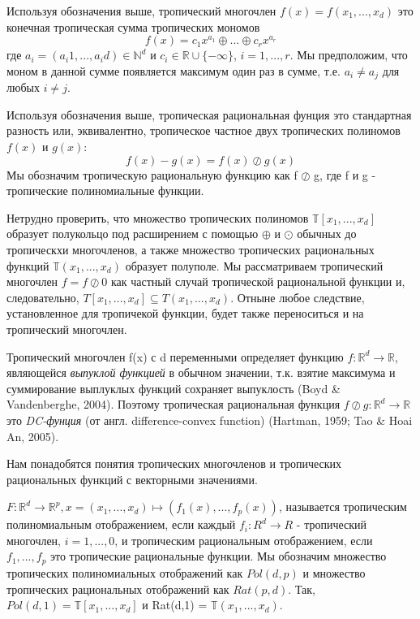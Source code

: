 \documentclass[russian]{lecture-notes}
\begin{document}
	\begin{Definition}
		Используя обозначения выше, тропический многочлен $f(x) = f(x_1,...,x_d)$ это конечная тропическая сумма тропических мономов
		\begin{equation*}
		f(x) = {c_1} x^{a_1} \oplus ... \oplus {c_r}x^{a_r}
		\end{equation*}
		где $a_i = (a_i1,...,a_id) \in \mathbb{N}^d$ и $c_i \in \mathbb{R} \cup \{- \infty\}$, $i=1,...,r$. Мы предположим, что моном в данной сумме появляется максимум один раз в сумме, т.е. $a_i \ne a_j$ для любых $i \ne j$. 
	\end{Definition}
	
	\begin{Definition}
		Используя обозначения выше, тропическая рациональная фунция это стандартная разность или, эквивалентно, тропическое частное двух тропических полиномов $f(x)$ и $g(x)$:
		\begin{equation*}
		f(x) - g(x) = f(x) \oslash g(x)
		\end{equation*}
		Мы обозначим тропическую рациональную функцию как f $\oslash$ g, где f и g - тропические полиномиальные функции.
	\end{Definition}
	
	Нетрудно проверить, что множество тропических полиномов $\mathbb{T}[x_1,...,x_d]$ образует полукольцо под расширением с помощью $\oplus$ и $\odot$ обычных до тропическхи многочленов, а также множество тропических рациональных функций $\mathbb{T}(x_1,...,x_d)$ образует полуполе. Мы рассматриваем тропический многочлен $f = f \oslash 0$ как частный случай тропической рациональной функции и, следовательно, $T[x_1,...,x_d] \subseteq T(x_1,...,x_d)$. Отныне любое следствие, установленное для тропичекой функции, будет также переноситься и на тропический многочлен.
	
	Тропический многочлен f(x) с d переменными определяет функцию $f: \mathbb{R}^d \to \mathbb{R}$, являющейся \textit{выпуклой функцией} в обычном значении, т.к. взятие максимума и суммирование выплуклых функций сохраняет выпуклость (Boyd \& Vandenberghe, 2004). Поэтому тропическая рациональная функция $f \oslash g : \mathbb{R}^d \to \mathbb{R}$ это \textit{DC-фунция} (от англ. difference-convex function) (Hartman, 1959; Tao \& Hoai An, 2005).
	
	Нам понадобятся понятия тропических многочленов и тропических рациональных функций с векторными значениями.
	
	\begin{Definition}
		$ F : \mathbb{R}^d \to \mathbb{R}^p, x = (x_1,...,x_d) \mapsto (f_1(x),...,f_p(x))$, называется тропическим полиномиальным отображением, если каждый $f_i: R^d \to R$ - тропический многочлен, $i = 1,...,0$, и тропическим рациональным отображением, если $f_1,...,f_p$ это тропические рациональные функции. Мы обозначим множество тропических полиномиальных отображений как $Pol(d, p)$ и множество тропических рациональных отображений как $Rat(p, d)$. Так, $Pol(d,1) = \mathbb{T}[x_1,...,x_d]$ и Rat(d,1) = $\mathbb{T}(x_1,...,x_d)$.
	\end{Definition} 
	
\end{document}
